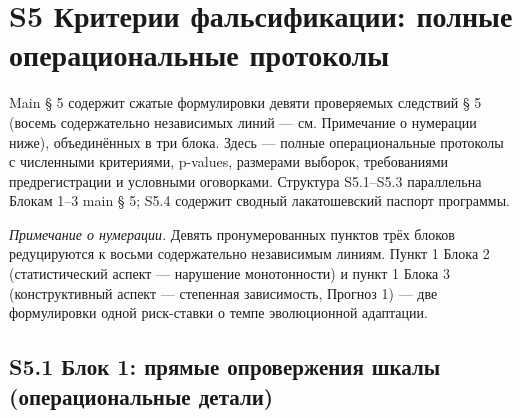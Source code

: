 \documentclass[pdflatex,sn-mathphys-ay]{sn-jnl}
\begin{document}
\section*{S5 Критерии фальсификации: полные операциональные протоколы}\label{s5-ux43aux440ux438ux442ux435ux440ux438ux438-ux444ux430ux43bux44cux441ux438ux444ux438ux43aux430ux446ux438ux438-ux43fux43eux43bux43dux44bux435-ux43eux43fux435ux440ux430ux446ux438ux43eux43dux430ux43bux44cux43dux44bux435-ux43fux440ux43eux442ux43eux43aux43eux43bux44b}

Main § 5 содержит сжатые формулировки девяти проверяемых следствий § 5 (восемь содержательно независимых линий --- см. Примечание о нумерации ниже), объединённых в три блока. Здесь --- полные операциональные протоколы с численными критериями, p-values, размерами выборок, требованиями предрегистрации и условными оговорками. Структура S5.1--S5.3 параллельна Блокам 1--3 main § 5; S5.4 содержит сводный лакатошевский паспорт программы.

\emph{Примечание о нумерации.} Девять пронумерованных пунктов трёх блоков редуцируются к восьми содержательно независимым линиям. Пункт 1 Блока 2 (статистический аспект --- нарушение монотонности) и пункт 1 Блока 3 (конструктивный аспект --- степенная зависимость, Прогноз 1) --- две формулировки одной риск-ставки о темпе эволюционной адаптации.

\subsection*{S5.1 Блок 1: прямые опровержения шкалы (операциональные детали)}\label{s5.1-ux431ux43bux43eux43a-1-ux43fux440ux44fux43cux44bux435-ux43eux43fux440ux43eux432ux435ux440ux436ux435ux43dux438ux44f-ux448ux43aux430ux43bux44b-ux43eux43fux435ux440ux430ux446ux438ux43eux43dux430ux43bux44cux43dux44bux435-ux434ux435ux442ux430ux43bux438}
\end{document}
